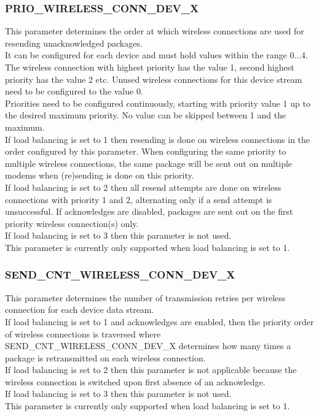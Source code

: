 \subsubsection{PRIO\_WIRELESS\_CONN\_DEV\_X}
This parameter determines the order at which wireless connections are used for resending unacknowledged packages.\\
It can be configured for each device and must hold values within the range 0...4. The wireless connection with highest priority has the value 1, second highest priority has the value 2 etc. Unused wireless connections for this device stream need to be configured to the value 0.\\
Priorities need to be configured continuously, starting with priority value 1 up to the desired maximum priority. No value can be skipped between 1 and the maximum.\\
If load balancing is set to 1 then resending is done on wireless connections in the order configured by this parameter. When configuring the same priority to multiple wireless connections, the same package will be sent out on multiple modems when (re)sending is done on this priority.\\
If load balancing is set to 2 then all resend attempts are done on wireless connections with priority 1 and 2, alternating only if a send attempt is unsuccessful. If acknowledges are disabled, packages are sent out on the first priority wireless connection(s) only.\\
If load balancing is set to 3 then this parameter is not used.\\
This parameter is currently only supported when load balancing is set to 1.
%
\subsubsection{SEND\_CNT\_WIRELESS\_CONN\_DEV\_X}
This parameter determines the number of transmission retries per wireless connection for each device data stream.\\
If load balancing is set to 1 and acknowledges are enabled, then the priority order of wireless connections is traversed where SEND\_CNT\_WIRELESS\_CONN\_DEV\_X determines how many times a package is retransmitted on each wireless connection.\\
If load balancing is set to 2 then this parameter is not applicable because the wireless connection is switched upon first absence of an acknowledge.\\
If load balancing is set to 3 then this parameter is not used.\\
This parameter is currently only supported when load balancing is set to 1.
%
